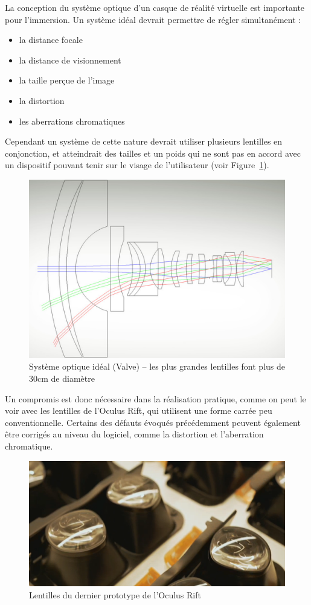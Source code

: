 \documentclass[a4,12pt]{scrartcl}
\begin{document}
La conception du système optique d’un casque de réalité virtuelle est importante pour l’immersion. Un système idéal devrait permettre de régler simultanément : 
\begin{itemize}
	\item la distance focale
	\item la distance de visionnement
	\item la taille perçue de l’image
	\item la distortion
	\item les aberrations chromatiques
\end{itemize}

Cependant un système de cette nature devrait utiliser plusieurs lentilles en conjonction, et atteindrait des tailles et un poids qui ne sont pas en accord avec un dispositif pouvant tenir sur le visage de l’utilisateur (voir Figure~\ref{ideal-lens}).

\begin{figure}[H]
	\centering
	\includegraphics[width=0.6\linewidth]{lens}
	\caption{Système optique idéal (Valve) -- les plus grandes lentilles font plus de 30cm de diamètre}
	\label{ideal-lens}
\end{figure}

Un compromis est donc nécessaire dans la réalisation pratique, comme on peut le voir avec les lentilles de l’Oculus Rift, qui utilisent une forme carrée peu conventionnelle. Certains des défauts évoqués précédemment peuvent également être corrigés au niveau du logiciel, comme la distortion et l’aberration chromatique.

\begin{figure}[H]
	\centering
	\includegraphics[width=0.7\linewidth]{crescent-bay-lens}
	\caption{Lentilles du dernier prototype de l’Oculus Rift}
\end{figure}
\end{document}
